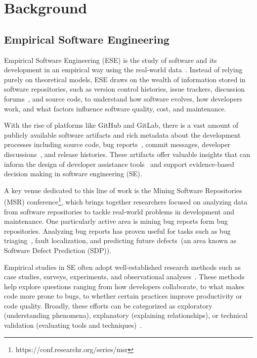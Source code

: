 \documentclass[\main/thesis.tex]{subfiles}
\begin{document}
\chapter{Background}
\label{chp:background}

\section{Empirical Software Engineering}
Empirical Software Engineering (ESE) is the study of software and its development in an empirical way using the real-world data~\cite{kitchenham2008evaluating}. Instead of relying purely on theoretical models, ESE draws on the wealth of information stored in software repositories, such as version control histories, issue trackers, discussion forums~\cite{chatterjee2020software}, and source code, to understand how software evolves, how developers work, and what factors influence software quality, cost, and maintenance.

With the rise of platforms like GitHub and GitLab, there is a vast amount of publicly available software artifacts and rich metadata about the development processes including source code, bug reports~\cite{bettenburg2008makes}, commit messages, developer discussions~\cite{ehsan2020empirical,venkatesh2016client}, and release histories. These artifacts offer valuable insights that can inform the design of developer assistance tools~\cite{hassan2006mining} and support evidence-based decision making in software engineering (SE). 
 
 
A key venue dedicated to this line of work is the Mining Software Repositories (MSR) conference\footnote{https://conf.researchr.org/series/msr}, which brings together researchers focused on analyzing data from software repositories to tackle real-world problems in development and maintenance. One particularly active area is mining bug reports form bug repositories. Analyzing bug reports has proven useful for tasks such as bug triaging~\cite{hu2014effective}, fault localization, and predicting future defects~\cite{li2018progress}(an area known as Software Defect Prediction (SDP)). 

Empirical studies in SE often adopt well-established research methods such as case studies, surveys, experiments, and observational analyses~\cite{kitchenham2008evaluating}. These methods help explore questions ranging from how developers collaborate, to what makes code more prone to bugs, to whether certain practices improve productivity or code quality. Broadly, these efforts can be categorized as exploratory (understanding phenomena), explanatory (explaining relationships), or technical validation (evaluating tools and techniques)~\cite{kitchenham2008evaluating}.
\end{document}
